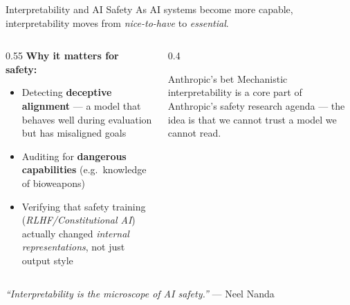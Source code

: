 \documentclass[aspectratio=169]{beamer}
\begin{document}
\begin{frame}{Interpretability and AI Safety}
  As AI systems become more capable, interpretability moves from
  \emph{nice-to-have} to \emph{essential}.

  \vspace{0.7em}
  \begin{columns}[T]
    \begin{column}{0.55\textwidth}
      \textbf{Why it matters for safety:}
      \begin{itemize}
        \item Detecting \textbf{deceptive alignment} — a model that behaves well
              during evaluation but has misaligned goals
        \item Auditing for \textbf{dangerous capabilities}
              (e.g.\ knowledge of bioweapons)
        \item Verifying that safety training
              (\textit{RLHF/Constitutional AI}) actually changed
              \emph{internal representations}, not just output style
      \end{itemize}
    \end{column}
    \begin{column}{0.4\textwidth}
      \begin{exampleblock}{Anthropic's bet}
        Mechanistic interpretability is a core part of Anthropic's
        safety research agenda — the idea is that we cannot trust
        a model we cannot read.
      \end{exampleblock}
    \end{column}
  \end{columns}

  \vspace{0.7em}
  \small \textit{``Interpretability is the microscope of AI safety.''} — Neel Nanda
\end{frame}
\end{document}
